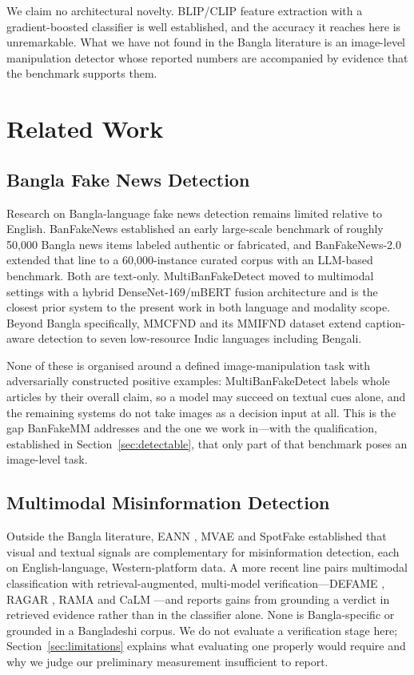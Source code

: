 \documentclass[pdflatex,sn-mathphys-num]{sn-jnl}
\begin{document}
We claim no architectural novelty. BLIP/CLIP feature extraction with a
gradient-boosted classifier is well established, and the accuracy it reaches
here is unremarkable. What we have not found in the Bangla literature is an
image-level manipulation detector whose reported numbers are accompanied by
evidence that the benchmark supports them.

\section{Related Work}

\subsection{Bangla Fake News Detection}

Research on Bangla-language fake news detection remains limited relative to
English. BanFakeNews \cite{banfakenews} established an early large-scale
benchmark of roughly 50{,}000 Bangla news items labeled authentic or
fabricated, and BanFakeNews-2.0 \cite{banfakenews2} extended that line to a
60{,}000-instance curated corpus with an LLM-based benchmark. Both are
text-only. MultiBanFakeDetect \cite{multibanfake} moved to multimodal
settings with a hybrid DenseNet-169/mBERT fusion architecture and is the
closest prior system to the present work in both language and modality scope.
Beyond Bangla specifically, MMCFND and its MMIFND dataset \cite{mmcfnd} extend
caption-aware detection to seven low-resource Indic languages including
Bengali.

None of these is organised around a defined image-manipulation task with
adversarially constructed positive examples: MultiBanFakeDetect labels whole
articles by their overall claim, so a model may succeed on textual cues alone,
and the remaining systems do not take images as a decision input at all. This
is the gap BanFakeMM \cite{banfakemm} addresses and the one we work in---with
the qualification, established in Section~\ref{sec:detectable}, that only part
of that benchmark poses an image-level task.

\subsection{Multimodal Misinformation Detection}

Outside the Bangla literature, EANN \cite{eann}, MVAE \cite{mvae} and SpotFake
\cite{spotfake} established that visual and textual signals are complementary
for misinformation detection, each on English-language, Western-platform data.
A more recent line pairs multimodal classification with retrieval-augmented,
multi-model verification---DEFAME \cite{defame}, RAGAR \cite{ragar}, RAMA
\cite{rama} and CaLM \cite{calm}---and reports gains from grounding a verdict
in retrieved evidence rather than in the classifier alone. None is
Bangla-specific or grounded in a Bangladeshi corpus. We do not evaluate a
verification stage here; Section~\ref{sec:limitations} explains what
evaluating one properly would require and why we judge our preliminary
measurement insufficient to report.
\end{document}
